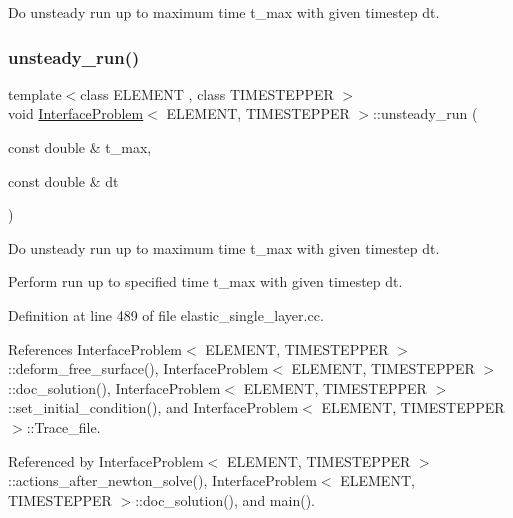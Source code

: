 Do unsteady run up to maximum time t\+\_\+max with given timestep dt. 

\mbox{\label{classInterfaceProblem_adf1f4e43d10939e4323e0e315b711085}} 
\subsubsection{\texorpdfstring{unsteady\+\_\+run()}{unsteady\_run()}\hspace{0.1cm}{\footnotesize\ttfamily [2/2]}}
{\footnotesize\ttfamily template$<$class E\+L\+E\+M\+E\+NT , class T\+I\+M\+E\+S\+T\+E\+P\+P\+ER $>$ \\
void \hyperlink{classInterfaceProblem}{Interface\+Problem}$<$ E\+L\+E\+M\+E\+NT, T\+I\+M\+E\+S\+T\+E\+P\+P\+ER $>$\+::unsteady\+\_\+run (\begin{DoxyParamCaption}\item[{const double \&}]{t\+\_\+max,  }\item[{const double \&}]{dt }\end{DoxyParamCaption})}



Do unsteady run up to maximum time t\+\_\+max with given timestep dt. 

Perform run up to specified time t\+\_\+max with given timestep dt. 

Definition at line 489 of file elastic\+\_\+single\+\_\+layer.\+cc.



References Interface\+Problem$<$ E\+L\+E\+M\+E\+N\+T, T\+I\+M\+E\+S\+T\+E\+P\+P\+E\+R $>$\+::deform\+\_\+free\+\_\+surface(), Interface\+Problem$<$ E\+L\+E\+M\+E\+N\+T, T\+I\+M\+E\+S\+T\+E\+P\+P\+E\+R $>$\+::doc\+\_\+solution(), Interface\+Problem$<$ E\+L\+E\+M\+E\+N\+T, T\+I\+M\+E\+S\+T\+E\+P\+P\+E\+R $>$\+::set\+\_\+initial\+\_\+condition(), and Interface\+Problem$<$ E\+L\+E\+M\+E\+N\+T, T\+I\+M\+E\+S\+T\+E\+P\+P\+E\+R $>$\+::\+Trace\+\_\+file.



Referenced by Interface\+Problem$<$ E\+L\+E\+M\+E\+N\+T, T\+I\+M\+E\+S\+T\+E\+P\+P\+E\+R $>$\+::actions\+\_\+after\+\_\+newton\+\_\+solve(), Interface\+Problem$<$ E\+L\+E\+M\+E\+N\+T, T\+I\+M\+E\+S\+T\+E\+P\+P\+E\+R $>$\+::doc\+\_\+solution(), and main().



